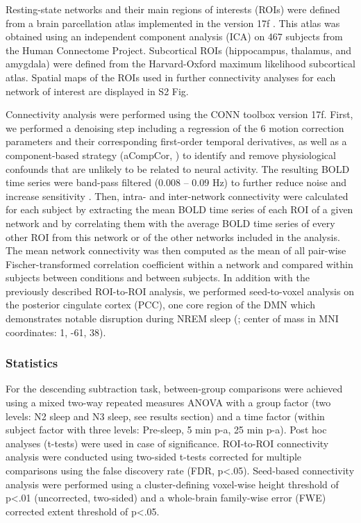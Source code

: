 Resting-state networks and their main regions of interests (ROIs) were defined from a brain parcellation atlas implemented in the  version 17f \citep{whitfield-gabrieli_conn:_2012}. This atlas was obtained using an independent component analysis (ICA) on 467 subjects from the Human Connectome Project. Subcortical ROIs (hippocampus, thalamus, and amygdala) were defined from the Harvard-Oxford maximum likelihood subcortical atlas. Spatial maps of the ROIs used in further connectivity analyses for each network of interest are displayed in S2 Fig.

Connectivity analysis were performed using the CONN toolbox version 17f. First, we performed a denoising step including a regression of the 6 motion correction parameters and their corresponding first-order temporal derivatives, as well as a component-based strategy (aCompCor, \citealp{behzadi_component_2007}) to identify and remove physiological confounds that are unlikely to be related to neural activity. The resulting BOLD time series were band-pass filtered (0.008 – 0.09 Hz) to further reduce noise and increase sensitivity \citep{weissenbacher_correlations_2009}. Then, intra- and inter-network connectivity were calculated for each subject by extracting the mean BOLD time series of each ROI of a given network and by correlating them with the average BOLD time series of every other ROI from this network or of the other networks included in the analysis. The mean network connectivity was then computed as the mean of all pair-wise Fischer-transformed correlation coefficient within a network and compared within subjects between conditions and between subjects. In addition with the previously described ROI-to-ROI analysis, we performed seed-to-voxel analysis on the posterior cingulate cortex (PCC), one core region of the DMN which demonstrates notable disruption during NREM sleep (\citealp{picchioni_sleep_2013}; center of mass in MNI coordinates: 1, -61, 38).

\subsubsection*{Statistics}
For the descending subtraction task, between-group comparisons were achieved using a mixed two-way repeated measures ANOVA with a group factor (two levels: N2 sleep and N3 sleep, see results section) and a time factor (within subject factor with three levels: Pre-sleep, 5 min p-a, 25 min p-a). Post hoc analyses (t-tests) were used in case of significance. ROI-to-ROI connectivity analysis were conducted using two-sided t-tests corrected for multiple comparisons using the false discovery rate (FDR, p<.05). Seed-based connectivity analysis were performed using a cluster-defining voxel-wise height threshold of p<.01 (uncorrected, two-sided) and a whole-brain family-wise error (FWE) corrected extent threshold of p<.05.

